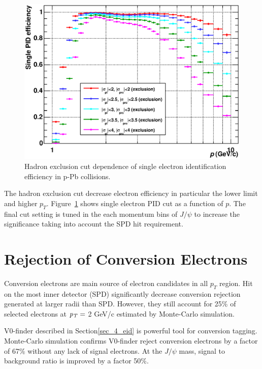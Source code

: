 \begin{figure}[htbp]
  \begin{center}
    \includegraphics[width=12cm]{chap4/figure/PID/SinglePIDEff_LHC13d10.eps}
  \end{center}
  \label{fig_4_pideff}
  \caption{Hadron exclusion cut dependence of single electron identification efficiency in p-Pb collisions.}
\end{figure}

The hadron exclusion cut decrease electron efficiency in particular the lower limit and higher $p_{T}$. 
Figure~\ref{fig_4_pideff} shows single electron PID cut as a function of $p$. 
The final cut setting is tuned in the each momentum bins of $J/\psi$ to increase the significance taking into account the SPD hit requirement.



\section{Rejection of Conversion Electrons}
\label{sec_4_convref}
Conversion electrons are main source of electron candidates in all $p_{T}$ region.
Hit on the most inner detector (SPD) significantly decrease conversion rejection generated at larger radii than SPD.
However, they still account for 25\% of selected electrons at $\it{p}_{T} =$ 2 GeV/c estimated by Monte-Carlo simulation.  

V0-finder described in Section\ref{sec_4_eid} is powerful tool for conversion tagging. 
Monte-Carlo simulation confirms V0-finder reject conversion electrons by a factor of 67\% without any lack of signal electrons. 
At the $J/\psi$ mass, signal to background ratio is improved by a factor 50\%. 

